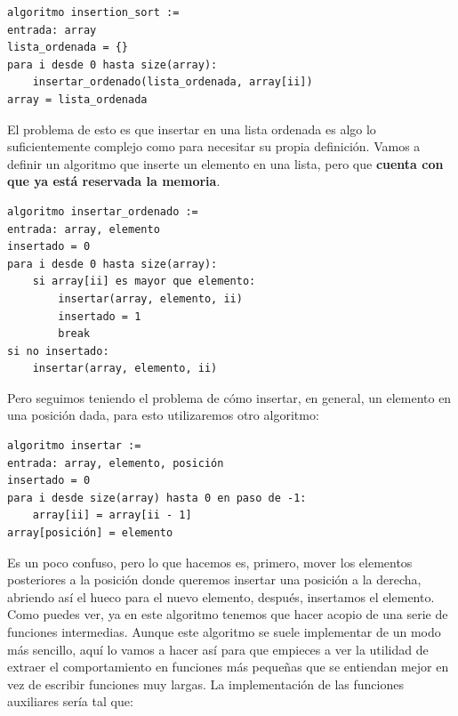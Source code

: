 \documentclass[a4paper]{article}
\begin{document}
\noindent
\begin{minipage}[H]{\linewidth}
\mbox{}
\begin{lstlisting}[style=pseudoCode]
algoritmo insertion_sort :=
entrada: array
lista_ordenada = {}
para i desde 0 hasta size(array):
    insertar_ordenado(lista_ordenada, array[ii])
array = lista_ordenada
\end{lstlisting}
\end{minipage}

El problema de esto es que insertar en una lista ordenada es algo lo
suficientemente complejo como para necesitar su propia definición. Vamos
a definir un algoritmo que inserte un elemento en una lista, pero que
\textbf{cuenta con que ya está reservada la memoria}.

\noindent
\begin{minipage}[H]{\linewidth}
\mbox{}
\begin{lstlisting}[style=pseudoCode]
algoritmo insertar_ordenado :=
entrada: array, elemento
insertado = 0
para i desde 0 hasta size(array):
    si array[ii] es mayor que elemento:
        insertar(array, elemento, ii)
        insertado = 1
        break
si no insertado:
    insertar(array, elemento, ii)
\end{lstlisting}
\end{minipage}

Pero seguimos teniendo el problema de cómo insertar, en general, un elemento
en una posición dada, para esto utilizaremos otro algoritmo:

\noindent
\begin{minipage}[H]{\linewidth}
\mbox{}
\begin{lstlisting}[style=pseudoCode]
algoritmo insertar :=
entrada: array, elemento, posición
insertado = 0
para i desde size(array) hasta 0 en paso de -1:
    array[ii] = array[ii - 1]
array[posición] = elemento
\end{lstlisting}
\end{minipage}

Es un poco confuso, pero lo que hacemos es, primero, mover los elementos
posteriores a la posición donde queremos insertar una posición a la derecha,
abriendo así el hueco para el nuevo elemento, después, insertamos el elemento.
Como puedes ver, ya en este algoritmo tenemos que hacer acopio de una serie
de funciones intermedias. Aunque este algoritmo se suele implementar
de un modo más sencillo, aquí lo vamos a hacer así para que empieces a ver
la utilidad de extraer el comportamiento en funciones más pequeñas que se
entiendan mejor en vez de escribir funciones muy largas. La implementación
de las funciones auxiliares sería tal que:
\end{document}
